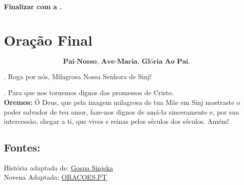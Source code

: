 \documentclass[a4paper,14pt]{extarticle} \usepackage[utf8]{inputenc}
\makeatletter
\newcommand{\vers@resp@sym}{%
  \raisebox{0.2ex}{\rotatebox[origin=c]{-20}{$\m@th\rceil$}}%
}
\newcommand{\vers@resp}[2]{%
  {\ooalign{%
     \hidewidth\kern#1\vers@resp@sym\hidewidth\cr
     #2\cr
  }}%
}
\DeclareRobustCommand{\versicle}{\vers@resp{-0.1em}{V}}
\DeclareRobustCommand{\response}{\vers@resp{0pt}{R}}
\makeatother
\begin{document}
\noindent
\textbf{Finalizar com a .}

\newpage
\section{Oração Final} \label{oracao-final}

\[
  \textbf{Pai-Nosso, Ave-Maria, Glória Ao Pai.}
\]

\response. \quad Roga por nós, Milagrosa Nossa Senhora de Sinj!

\versicle. \quad Para que nos tornemos dignos das promessas de Cristo. \\

\textbf{Oremos:} Ó Deus, que pela imagem milagrosa de tua Mãe em Sinj mostraste o poder salvador de teu amor, faze-nos dignos de amá-la sinceramente e, por sua intercessão, chegar a ti, que vives e reinas pelos séculos dos séculos. Amém!


\vfill

\begin{center}
\subsection*{Fontes:}
História adaptada de: \underline{\href{https://www.gospa-sinjska.hr/index.php/kroz-proslost/51-povijest-stovanja-gospe-sinjske}{Gospa Sinjska}}\\ 
Novena Adaptada: \underline{\href{https://oracoes.pt/novena-a-nossa-senhora-de-sinjska/}{ORACOES.PT}}
\end{center}
\end{document}
